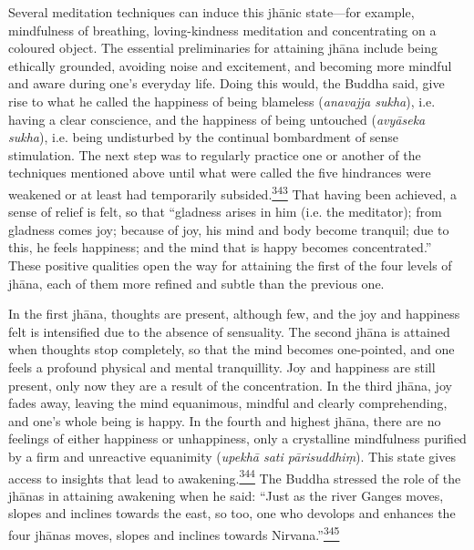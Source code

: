 Several meditation techniques can induce this jhānic state---for
example, mindfulness of breathing, loving-kindness meditation and
concentrating on a coloured object. The essential preliminaries for
attaining jhāna include being ethically grounded, avoiding noise and
excitement, and becoming more mindful and aware during one's everyday
life. Doing this would, the Buddha said, give rise to what he called the
happiness of being blameless (\emph{anavajja sukha}), i.e. having a
clear conscience, and the happiness of being untouched (\emph{avyāseka
sukha}), i.e. being undisturbed by the continual bombardment of sense
stimulation. The next step was to regularly practice one or another of
the techniques mentioned above until what were called the five
hindrances were weakened or at least had temporarily
subsided.\label{footprints_split_011.html_fnref343}\hyperref[footprints_split_024.htmlux5cux23fn343]{\textsuperscript{343}}
That having been achieved, a sense of relief is felt, so that ``gladness
arises in him (i.e. the meditator); from gladness comes joy; because of
joy, his mind and body become tranquil; due to this, he feels happiness;
and the mind that is happy becomes concentrated.'' These positive
qualities open the way for attaining the first of the four levels of
jhāna, each of them more refined and subtle than the previous one.

In the first jhāna, thoughts are present, although few, and the joy and
happiness felt is intensified due to the absence of sensuality. The
second jhāna is attained when thoughts stop completely, so that the mind
becomes one-pointed, and one feels a profound physical and mental
tranquillity. Joy and happiness are still present, only now they are a
result of the concentration. In the third jhāna, joy fades away, leaving
the mind equanimous, mindful and clearly comprehending, and one's whole
being is happy. In the fourth and highest jhāna, there are no feelings
of either happiness or unhappiness, only a crystalline mindfulness
purified by a firm and unreactive equanimity (\emph{upekhā sati
pārisuddhiṃ}). This state gives access to insights that lead to
awakening.\label{footprints_split_011.html_fnref344}\hyperref[footprints_split_024.htmlux5cux23fn344]{\textsuperscript{344}}
The Buddha stressed the role of the jhānas in attaining awakening when
he said: ``Just as the river Ganges moves, slopes and inclines towards
the east, so too, one who devolops and enhances the four jhānas moves,
slopes and inclines towards
Nirvana.''\label{footprints_split_011.html_fnref345}\hyperref[footprints_split_024.htmlux5cux23fn345]{\textsuperscript{345}}

